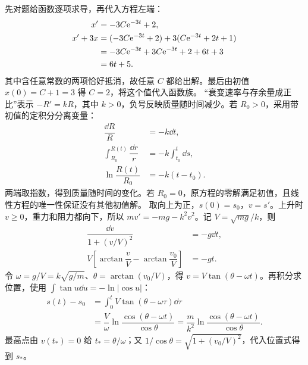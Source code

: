 先对题给函数逐项求导，再代入方程左端：
\[
\begin{aligned}
x'&=-3C\mathrm e^{-3t}+2,\\
x'+3x&=(-3C\mathrm e^{-3t}+2)+3(C\mathrm e^{-3t}+2t+1)\\
&=-3C\mathrm e^{-3t}+3C\mathrm e^{-3t}+2+6t+3\\
&=6t+5.
\end{aligned}
\]
其中含任意常数的两项恰好抵消，故任意 $C$ 都给出解。最后由初值 $x(0)=C+1=3$ 得 $C=2$，将这个值代入函数族。
“衰变速率与存余量成正比”表示 $-R'=kR$，其中 $k>0$，负号反映质量随时间减少。若 $R_0>0$，采用带初值的定积分分离变量：
\[
\begin{aligned}
\dfrac{\dd R}{R}&=-k\dd t,\\
\int_{R_0}^{R(t)}\dfrac{\dd r}{r}&=-k\int_{t_0}^t\dd s,\\
\ln\dfrac{R(t)}{R_0}&=-k(t-t_0).
\end{aligned}
\]
两端取指数，得到质量随时间的变化。若 $R_0=0$，原方程的零解满足初值，且线性方程的唯一性保证没有其他初值解。
取向上为正，$s(0)=s_0$，$v=s'$。上升时 $v\ge0$，重力和阻力都向下，所以 $mv'=-mg-k^2v^2$。记 $V=\sqrt{mg}/k$，则
\[
\begin{aligned}
\dfrac{\dd v}{1+(v/V)^2}&=-g\dd t,\\
V\left[\arctan\dfrac vV-\arctan\dfrac{v_0}{V}\right]&=-gt.
\end{aligned}
\]
令 $\omega=g/V=k\sqrt{g/m}$、$\theta=\arctan(v_0/V)$，得 $v=V\tan(\theta-\omega t)$。再积分求位置，使用 $\displaystyle \int\tan u\dd u=-\ln|\cos u|$：
\[
\begin{aligned}
s(t)-s_0&=\int_0^t V\tan(\theta-\omega\tau)\dd\tau\\
&=\dfrac V\omega\ln\dfrac{\cos(\theta-\omega t)}{\cos\theta}
=\dfrac m{k^2}\ln\dfrac{\cos(\theta-\omega t)}{\cos\theta}.
\end{aligned}
\]
最高点由 $v(t_*)=0$ 给 $t_*=\theta/\omega$；又 $1/\cos\theta=\sqrt{1+(v_0/V)^2}$，代入位置式得到 $s_*$。

